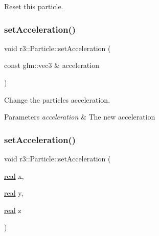 Reset this particle. 

\mbox{\label{classr3_1_1_particle_ad4c180ad74ee8cfd1b0e5c76347d6182}} 
\subsubsection{\texorpdfstring{set\+Acceleration()}{setAcceleration()}\hspace{0.1cm}{\footnotesize\ttfamily [1/2]}}
{\footnotesize\ttfamily void r3\+::\+Particle\+::set\+Acceleration (\begin{DoxyParamCaption}\item[{const glm\+::vec3 \&}]{acceleration }\end{DoxyParamCaption})}



Change the particle\textquotesingle{}s acceleration. 


\begin{DoxyParams}{Parameters}
{\em acceleration} & The new acceleration \\
\hline
\end{DoxyParams}
\mbox{\label{classr3_1_1_particle_a4043de464de32d14d8db0f676f63da75}} 
\subsubsection{\texorpdfstring{set\+Acceleration()}{setAcceleration()}\hspace{0.1cm}{\footnotesize\ttfamily [2/2]}}
{\footnotesize\ttfamily void r3\+::\+Particle\+::set\+Acceleration (\begin{DoxyParamCaption}\item[{\mbox{\hyperlink{namespacer3_ab2016b3e3f743fb735afce242f0dc1eb}{real}}}]{x,  }\item[{\mbox{\hyperlink{namespacer3_ab2016b3e3f743fb735afce242f0dc1eb}{real}}}]{y,  }\item[{\mbox{\hyperlink{namespacer3_ab2016b3e3f743fb735afce242f0dc1eb}{real}}}]{z }\end{DoxyParamCaption})}



